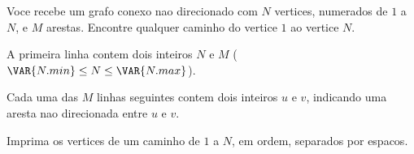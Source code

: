 Voce recebe um grafo conexo nao direcionado com $N$ vertices, numerados de $1$
a $N$, e $M$ arestas. Encontre qualquer caminho do vertice $1$ ao vertice $N$.

A primeira linha contem dois inteiros $N$ e $M$
($\VAR{N.min} \le N \le \VAR{N.max}$).

Cada uma das $M$ linhas seguintes contem dois inteiros $u$ e $v$, indicando uma
aresta nao direcionada entre $u$ e $v$.

Imprima os vertices de um caminho de $1$ a $N$, em ordem, separados por espacos.
